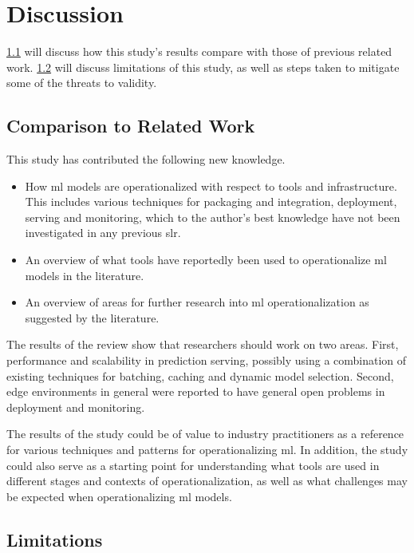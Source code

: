 \chapter{Discussion}
\label{ch:discussion}
\cref{ch:discussion:comparison_to_related_work} will discuss how this study's results compare with those of previous related work.
\cref{ch:discussion:limitations} will discuss limitations of this study, as well as steps taken to mitigate some of the threats to validity.

\section{Comparison to Related Work}
\label{ch:discussion:comparison_to_related_work}
This study has contributed the following new knowledge.
\begin{itemize}
    \item How \acrshort{ml} models are operationalized with respect to tools and infrastructure. This includes various techniques for packaging and integration, deployment, serving and monitoring, which to the author's best knowledge have not been investigated in any previous \acrshort{slr}.
    \item An overview of what tools have reportedly been used to operationalize \acrshort{ml} models in the literature.
    \item An overview of areas for further research into \acrshort{ml} operationalization as suggested by the literature.
\end{itemize}

The results of the review show that researchers should work on two areas.
First, performance and scalability in prediction serving, possibly using a combination of existing techniques for batching, caching and dynamic model selection.
Second, edge environments in general were reported to have general open problems in deployment and monitoring.

The results of the study could be of value to industry practitioners as a reference for various techniques and patterns for operationalizing \acrshort{ml}.
In addition, the study could also serve as a starting point for understanding what tools are used in different stages and contexts of operationalization, as well as what challenges may be expected when operationalizing \acrshort{ml} models.

\section{Limitations}
\label{ch:discussion:limitations}
